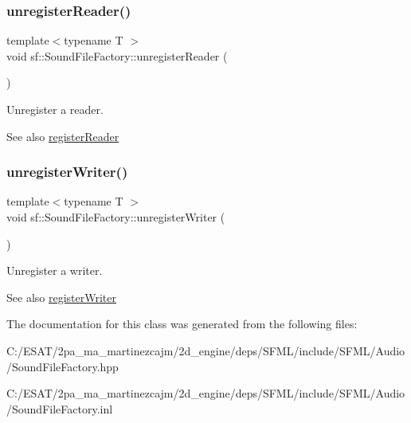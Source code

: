 \subsubsection{\texorpdfstring{unregister\+Reader()}{unregisterReader()}}
{\footnotesize\ttfamily template$<$typename T $>$ \\
void sf\+::\+Sound\+File\+Factory\+::unregister\+Reader (\begin{DoxyParamCaption}{ }\end{DoxyParamCaption})\hspace{0.3cm}{\ttfamily [static]}}



Unregister a reader. 

\begin{DoxySeeAlso}{See also}
\hyperlink{classsf_1_1_sound_file_factory_acaf1f0bf1b7c7b9988ec76b33e33fe95}{register\+Reader} 
\end{DoxySeeAlso}
\mbox{\label{classsf_1_1_sound_file_factory_a2306f90d1f72e474732e4bcceeb34215}} 
\subsubsection{\texorpdfstring{unregister\+Writer()}{unregisterWriter()}}
{\footnotesize\ttfamily template$<$typename T $>$ \\
void sf\+::\+Sound\+File\+Factory\+::unregister\+Writer (\begin{DoxyParamCaption}{ }\end{DoxyParamCaption})\hspace{0.3cm}{\ttfamily [static]}}



Unregister a writer. 

\begin{DoxySeeAlso}{See also}
\hyperlink{classsf_1_1_sound_file_factory_a3a59140e6ccf1f252f721b790eddd661}{register\+Writer} 
\end{DoxySeeAlso}


The documentation for this class was generated from the following files\+:\begin{DoxyCompactItemize}
\item 
C\+:/\+E\+S\+A\+T/2pa\+\_\+ma\+\_\+martinezcajm/2d\+\_\+engine/deps/\+S\+F\+M\+L/include/\+S\+F\+M\+L/\+Audio/Sound\+File\+Factory.\+hpp\item 
C\+:/\+E\+S\+A\+T/2pa\+\_\+ma\+\_\+martinezcajm/2d\+\_\+engine/deps/\+S\+F\+M\+L/include/\+S\+F\+M\+L/\+Audio/Sound\+File\+Factory.\+inl\end{DoxyCompactItemize}
